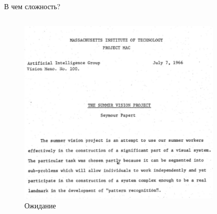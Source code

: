 \documentclass[aspectratio=169]{beamer}
\begin{document}
\begin{frame}{В чем сложность?}
    \begin{columns}
        \begin{column}{.43\linewidth}
            \begin{figure}
                \includegraphics[width=\linewidth]{graphs/fig3_0.jpg}
                \caption*{Ожидание}
            \end{figure}
        \end{column}
        \pause{}
        \begin{column}{.24\linewidth}
            \begin{figure}

\end{figure}
\end{column}
\end{columns}
\end{frame}
\end{document}
